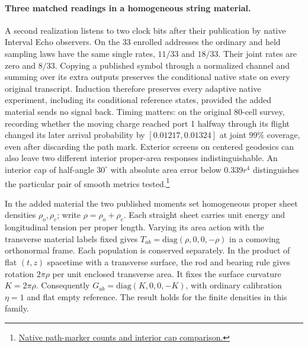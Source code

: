 \documentclass[11pt]{article}
\begin{document}
\paragraph{Three matched readings in a homogeneous string material.}
A second realization listens to two clock bits after their publication by
native Interval Echo observers. On the 33 enrolled addresses the ordinary
and held sampling laws have the same single rates, $11/33$ and $18/33$.
Their joint rates are zero and $8/33$. Copying a published symbol through
a normalized channel and summing over its extra outputs preserves the
conditional native state on every original transcript. Induction
therefore preserves every adaptive native experiment, including its
conditional reference states, provided the added material sends no
signal back. Timing matters: on the original 80-cell survey, recording
whether the moving charge reached port 1 halfway through its flight
changed its later arrival probability by $[0.01217,0.01324]$ at joint
$99\%$ coverage, even after discarding the path mark. Exterior screens
on centered geodesics can also leave two different interior proper-area
responses indistinguishable. An interior cap of half-angle $30^\circ$
with absolute area error below $0.339r^4$ distinguishes the particular
pair of smooth metrics tested.\footnote{\href{https://github.com/FloatingPragma/observer-patch-holography/tree/main/code/matched_einstein_limit/source_implication/full_geometry/station_balls/timelike_areas/exterior_screens}{Native path-marker counts and interior cap comparison.}}

In the added material the two published moments set homogeneous
proper sheet densities $\rho_o,\rho_c$; write $\rho=\rho_o+\rho_c$.
Each straight sheet carries unit energy and longitudinal tension per
proper length. Varying its area action with the transverse material
labels fixed gives $T_{ab}=\mathrm{diag}(\rho,0,0,-\rho)$ in a comoving
orthonormal frame. Each population is conserved separately. In the
product of flat $(t,z)$ spacetime with a transverse surface, the rod and
bearing rule gives rotation $2\pi\rho$ per unit enclosed transverse area.
It fixes the surface curvature $K=2\pi\rho$. Consequently
$G_{ab}=\mathrm{diag}(K,0,0,-K)$, with ordinary calibration $\eta=1$
and flat empty reference. The result holds for the finite densities in
this family.
\end{document}
